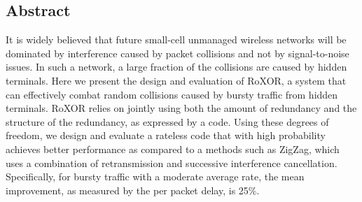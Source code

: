 \subsection*{Abstract}

It is widely believed that future small-cell unmanaged wireless networks will be dominated
by interference caused by packet collisions and not by signal-to-noise issues. In such a
network, a large fraction of the  collisions are caused by hidden terminals.
Here we present the design and evaluation of RoXOR, a system that can effectively combat
random collisions caused by bursty traffic from hidden terminals. RoXOR relies on jointly using both the amount of redundancy and the structure of the redundancy, as expressed by a code. Using these degrees of freedom, we design and evaluate a rateless code that with high probability achieves better performance as compared to a methods such as  ZigZag, which uses a combination of retransmission and successive interference cancellation. Specifically, for bursty traffic with a moderate average rate, the mean improvement, as measured by the per packet delay, is 25\%.